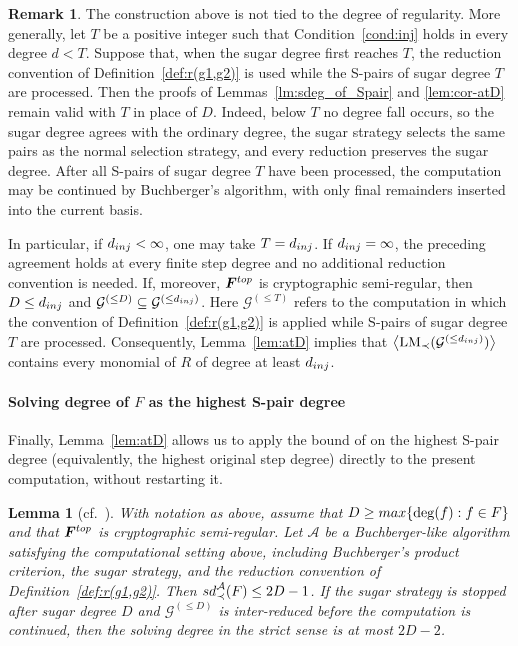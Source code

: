 \documentclass{article}
\newtheorem{lemma}[theorem]{Lemma}
\theoremstyle{definition}
\newtheorem{remark}[theorem]{Remark}
\theoremstyle{plain}
\theoremstyle{plain}
\theoremstyle{plain}
\theoremstyle{plain}
\numberwithin{equation}{subsection}
\begin{document}
\begin{remark}\label{rem:threshold}
The construction above is not tied to the degree of regularity.
More generally, let $T$ be a positive integer such that Condition~\ref{cond:inj} holds in every degree $d<T$.
Suppose that, when the sugar degree first reaches $T$, the reduction convention of Definition~\ref{def:r(g1,g2)} is used while the S-pairs of sugar degree $T$ are processed.
Then the proofs of Lemmas~\ref{lm:sdeg_of_Spair} and \ref{lem:cor-atD} remain valid with $T$ in place of $D$.
Indeed, below $T$ no degree fall occurs, so the sugar degree agrees with the ordinary degree, the sugar strategy selects the same pairs as the normal selection strategy, and every reduction preserves the sugar degree.
After all S-pairs of sugar degree $T$ have been processed, the computation may be continued by Buchberger's algorithm, with only final remainders inserted into the current basis.

In particular, if $d_{\rm inj}<\infty$, one may take $T=d_{\rm inj}$.
If $d_{\rm inj}=\infty$, the preceding agreement holds at every finite step degree and no additional reduction convention is needed.
If, moreover, $\bm F^{\rm top}$ is cryptographic semi-regular, then $D\leq d_{\rm inj}$ and $\mathcal G^{(\leq D)}\subseteq \mathcal G^{(\leq d_{\rm inj})}$.
Here $\mathcal G^{(\leq T)}$ refers to the computation in which the convention of Definition~\ref{def:r(g1,g2)} is applied while S-pairs of sugar degree $T$ are processed.
Consequently, Lemma~\ref{lem:atD} implies that $\bigl\langle\operatorname{LM}_{\prec}(\mathcal G^{(\leq d_{\rm inj})}) \bigr\rangle$ contains every monomial of $R$ of degree at least $d_{\rm inj}$.
\end{remark}

\paragraph{Solving degree of $F$ as the highest S-pair degree}

Finally, Lemma~\ref{lem:atD} allows us to apply the bound of \cite[Lemma~4]{KY} on the highest S-pair degree (equivalently, the highest original step degree) directly to the present computation, without restarting it.

\begin{lemma}[cf.\ {\cite[Lemma 4]{KY}}]\label{lem:sd}
With notation as above, assume that $D\geq {\rm max}\{\deg(f) : f\in F\}$ and that $\bm{F}^{\rm top}$ is cryptographic semi-regular.
Let $\mathcal A$ be a Buchberger-like algorithm satisfying the computational setting above, including Buchberger's product criterion, the sugar strategy, and the reduction convention of Definition~\ref{def:r(g1,g2)}.
Then ${\rm sd}_\prec^{\mathcal{A}} (F) \leq 2D-1$.
If the sugar strategy is stopped after sugar degree $D$ and $\mathcal G^{(\leq D)}$ is inter-reduced before the computation is continued, then the solving degree in the strict sense is at most $2D-2$.
\end{lemma}
\end{document}
